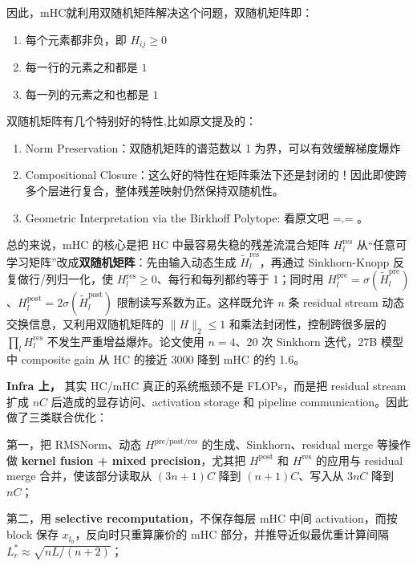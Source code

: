 \documentclass[
  11pt,
  a4paper,
  fontset=none]{ctexart}
\begin{document}
因此，mHC就利用双随机矩阵解决这个问题，双随机矩阵即：

\begin{enumerate}
\def\labelenumi{\arabic{enumi}.}
\item
  每个元素都非负，即 \(H_{ij}\ge 0\)
\item
  每一行的元素之和都是 \(1\)
\item
  每一列的元素之和也都是 \(1\)
\end{enumerate}

双随机矩阵有几个特别好的特性,比如原文提及的：

\begin{enumerate}
\def\labelenumi{\arabic{enumi}.}
\item
  Norm Preservation：双随机矩阵的谱范数以 1 为界，可以有效缓解梯度爆炸
\item
  Compositional
  Closure：这么好的特性在矩阵乘法下还是封闭的！因此即使跨多个层进行复合，整体残差映射仍然保持双随机性。
\item
  Geometric Interpretation via the Birkhoff Polytope: 看原文吧 =.= 。
\end{enumerate}

总的来说，mHC 的核心是把 HC 中最容易失稳的残差流混合矩阵
\(H_l^{\mathrm{res}}\)
从``任意可学习矩阵''改成\textbf{双随机矩阵}：先由输入动态生成
\(\tilde{H}_l^{\mathrm{res}}\)，再通过 Sinkhorn-Knopp
反复做行/列归一化，使 \(H_l^{\mathrm{res}}\ge 0\)、每行和每列都约等于
1；同时用
\(H_l^{\mathrm{pre}}=\sigma(\tilde{H}_l^{\mathrm{pre}})\)、\(H_l^{\mathrm{post}}=2\sigma(\tilde{H}_l^{\mathrm{post}})\)
限制读写系数为正。这样既允许 \(n\) 条 residual stream
动态交换信息，又利用双随机矩阵的 \(\|H\|_2\le 1\)
和乘法封闭性，控制跨很多层的 \(\prod_l H_l^{\mathrm{res}}\)
不发生严重增益爆炸。论文使用 \(n=4\)、20 次 Sinkhorn 迭代，27B 模型中
composite gain 从 HC 的接近 3000 降到 mHC 的约 1.6。

\textbf{Infra 上，} 其实 HC/mHC 真正的系统瓶颈不是 FLOPs，而是把
residual stream 扩成 \(nC\) 后造成的显存访问、activation storage 和
pipeline communication。因此做了三类联合优化：

第一，把 RMSNorm、动态 \(H^{\mathrm{pre/post/res}}\)
的生成、Sinkhorn、residual merge 等操作做 \textbf{kernel fusion + mixed
precision}，尤其把 \(H^{\mathrm{post}}\) 和 \(H^{\mathrm{res}}\)
的应用与 residual merge 合并，使该部分读取从 \((3n+1)C\) 降到
\((n+1)C\)、写入从 \(3nC\) 降到 \(nC\)；

第二，用 \textbf{selective recomputation}，不保存每层 mHC 中间
activation，而按 block 保存 \(x_{l_0}\)，反向时只重算廉价的 mHC
部分，并推导近似最优重计算间隔 \(L_r^*\approx\sqrt{nL/(n+2)}\)；
\end{document}
